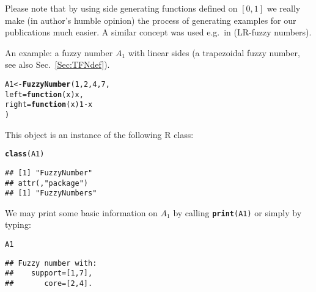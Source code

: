 \documentclass[11pt]{article}\usepackage{graphicx, color}
\makeatletter
\newcommand{\hlfunctioncall}[1]{\textcolor[rgb]{0.501960784313725,0,0.329411764705882}{\textbf{#1}}}%
\newenvironment{kframe}{%
 \def\at@end@of@kframe{}%
 \ifinner\ifhmode%
  \def\at@end@of@kframe{\end{minipage}}%
  \begin{minipage}{\columnwidth}%
 \fi\fi%
 \def\FrameCommand##1{\hskip\@totalleftmargin \hskip-\fboxsep
 \colorbox{shadecolor}{##1}\hskip-\fboxsep
     \hskip-\linewidth \hskip-\@totalleftmargin \hskip\columnwidth}%
 \MakeFramed {\advance\hsize-\width
   \@totalleftmargin\z@ \linewidth\hsize
   \@setminipage}}%
 {\par\unskip\endMakeFramed%
 \at@end@of@kframe}
\newenvironment{knitrout}{}{} %
\newcommand{\lang}[1]{\textsf{#1}\xspace}
\newcommand{\R}{\lang{R}}
\newcommand{\func}[1]{\texttt{\hlfunctioncall{#1}}}
\makeatother
\begin{document}
Please note that by using side generating functions defined on $[0,1]$
we really make (in author's humble opinion) the process of generating
examples for our publications much easier.
A similar concept was used e.g.~in \cite{StefaniniSorini2009:eusflat}
(LR-fuzzy numbers).

\bigskip
An example: a fuzzy number $A_1$ with linear sides
(a trapezoidal fuzzy number, see also Sec.~\ref{Sec:TFNdef}).

\begin{knitrout}\small
{}\color{fgcolor}\begin{kframe}
\begin{alltt}
A1 <- \hlfunctioncall{FuzzyNumber}(1, 2, 4, 7,
    left=\hlfunctioncall{function}(x) x,
   right=\hlfunctioncall{function}(x) 1-x
)
\end{alltt}
\end{kframe}
\end{knitrout}


\noindent
This object is an instance of the following \R class:

\begin{knitrout}\small
{}\color{fgcolor}\begin{kframe}
\begin{alltt}
\hlfunctioncall{class}(A1)
\end{alltt}
\begin{verbatim}
## [1] "FuzzyNumber"
## attr(,"package")
## [1] "FuzzyNumbers"
\end{verbatim}
\end{kframe}
\end{knitrout}


\noindent
We may print some basic information on $A_1$ by calling \texttt{\func{print}(A1)} or
simply by typing:

\begin{knitrout}\small
{}\color{fgcolor}\begin{kframe}
\begin{alltt}
A1
\end{alltt}
\begin{verbatim}
## Fuzzy number with:
##    support=[1,7],
##       core=[2,4].
\end{verbatim}
\end{kframe}
\end{knitrout}
\end{document}
